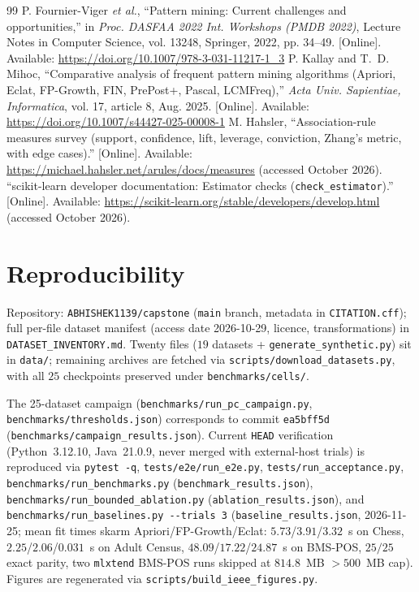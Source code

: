\documentclass[journal,a4paper]{IEEEtran}
\newcommand{\skarm}{skarm\xspace}
\begin{document}
\begin{thebibliography}{99}
 P. Fournier-Viger \emph{et al.}, ``Pattern mining: Current challenges and opportunities,'' in \emph{Proc. DASFAA 2022 Int. Workshops (PMDB 2022)}, Lecture Notes in Computer Science, vol. 13248, Springer, 2022, pp. 34--49. [Online]. Available: \url{https://doi.org/10.1007/978-3-031-11217-1_3}
 P. Kallay and T.~D. Mihoc, ``Comparative analysis of frequent pattern mining algorithms (Apriori, Eclat, FP-Growth, FIN, PrePost+, Pascal, LCMFreq),'' \emph{Acta Univ. Sapientiae, Informatica}, vol. 17, article 8, Aug. 2025. [Online]. Available: \url{https://doi.org/10.1007/s44427-025-00008-1}
 M. Hahsler, ``Association-rule measures survey (support, confidence, lift, leverage, conviction, Zhang's metric, with edge cases).'' [Online]. Available: \url{https://michael.hahsler.net/arules/docs/measures} (accessed October 2026).
 ``scikit-learn developer documentation: Estimator checks (\texttt{check\_estimator}).'' [Online]. Available: \url{https://scikit-learn.org/stable/developers/develop.html} (accessed October 2026).
\end{thebibliography}

\appendices
\section{Reproducibility}
\label{app:repro}

Repository: \texttt{ABHISHEK1139/capstone} (\texttt{main} branch, metadata in \texttt{CITATION.cff}); full per-file dataset manifest (access date 2026-10-29, licence, transformations) in \texttt{DATASET\_INVENTORY.md}. Twenty files ($19$ datasets + \texttt{generate\_synthetic.py}) sit in \texttt{data/}; remaining archives are fetched via \texttt{scripts/download\_datasets.py}, with all $25$ checkpoints preserved under \texttt{benchmarks/cells/}.

The 25-dataset campaign (\texttt{benchmarks/run\_pc\_campaign.py}, \texttt{benchmarks/thresholds.json}) corresponds to commit \texttt{ea5bff5d} (\texttt{benchmarks/campaign\_results.json}). Current \texttt{HEAD} verification (Python~3.12.10, Java~21.0.9, never merged with external-host trials) is reproduced via \texttt{pytest -q}, \texttt{tests/e2e/run\_e2e.py}, \texttt{tests/run\_acceptance.py}, \texttt{benchmarks/run\_benchmarks.py} (\texttt{benchmark\_results.json}), \texttt{benchmarks/run\_bounded\_ablation.py} (\texttt{ablation\_results.json}), and \texttt{benchmarks/run\_baselines.py -{}-trials 3} (\texttt{baseline\_results.json}, 2026-11-25; mean fit times \skarm Apriori/FP-Growth/Eclat: $5.73$/$3.91$/$3.32$~s on Chess, $2.25$/$2.06$/$0.031$~s on Adult Census, $48.09$/$17.22$/$24.87$~s on BMS-POS, $25/25$ exact parity, two \texttt{mlxtend} BMS-POS runs skipped at $814.8$~MB $>500$~MB cap). Figures are regenerated via \texttt{scripts/build\_ieee\_figures.py}.
\end{document}
